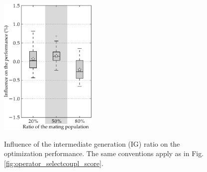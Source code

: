 \documentclass{ametsoc}
\begin{document}
\begin{figure}[t]
	\begin{center}
		\noindent\includegraphics[width=11pc,angle=0]{fig14.pdf}\\
	\end{center}
	\caption{Influence of the intermediate generation (IG) ratio on the optimization performance. The same conventions apply as in Fig. \ref{fig:operator_selectcoupl_score}.}
	\label{fig:option_popratio_score}
\end{figure}
\end{document}
